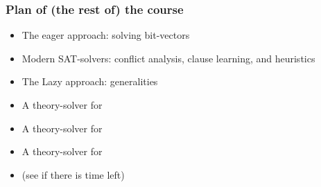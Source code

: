 \begin{frame}
  \frametitle{Plan of (the rest of) the course}

  \begin{itemize}
    \item The eager approach: solving bit-vectors
    \vfill
    \item Modern SAT-solvers: conflict analysis, clause learning, and heuristics
    \vfill
    \item The Lazy approach: generalities
    \vfill
    \item A theory-solver for \Idl
    \vfill
    \item A theory-solver for \Uf
    \vfill
    \item A theory-solver for \Lra
    \vfill
    \item (see if there is time left)
  \end{itemize}

\end{frame}
